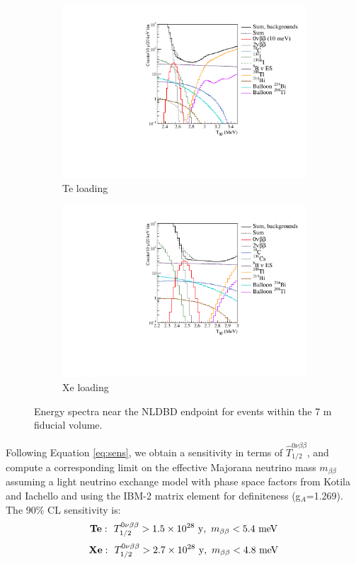 \begin{figure}
\centering
\begin{subfigure}[b]{0.49\textwidth}
 \includegraphics[width=\textwidth]{dbd/spectrum_plot_te_5.pdf}
 \caption{Te loading}
 \label{fig:spectrum-te}
\end{subfigure}
\begin{subfigure}[b]{0.49\textwidth}
 \includegraphics[width=\textwidth]{dbd/spectrum_plot_xe.pdf}
 \caption{Xe loading}
 \label{fig:spectrum-xe}
\end{subfigure}
\caption{Energy spectra near the NLDBD endpoint for events within the 7 m
fiducial volume.}
\label{fig:spectrum-plots}
\end{figure}

Following Equation \ref{eq:sens}, we obtain a sensitivity in terms of
$\hat{T}_{1/2}^{0\nu\beta\beta}$, and compute a corresponding limit on
the effective Majorana neutrino mass $m_{\beta\beta}$ assuming a light
neutrino exchange model with phase space factors from
Kotila and Iachello \cite{2012PhRvC..85c4316K} and using the IBM-2 matrix
element \cite{Barea:2013wb} for definiteness (g$_{A}$=1.269). The 90\% CL sensitivity
is:
\[
\mathrm{\bf Te:}~~
  T_{1/2}^{0\nu\beta\beta} > 1.5\times10^{28}~\mathrm{y},~
  m_{\beta\beta} < 5.4~\mathrm{meV}
\]
\[
\mathrm{\bf Xe:}~~
  T_{1/2}^{0\nu\beta\beta} > 2.7\times10^{28}~\mathrm{y},~
  m_{\beta\beta} < 4.8~\mathrm{meV}
\]


